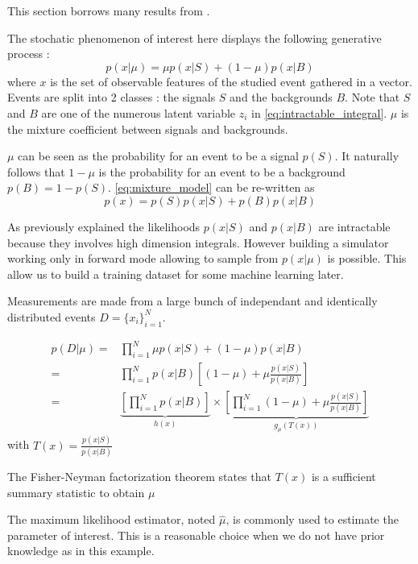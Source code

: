 This section borrows many results from \cite{Neal:2007zz}.

The stochatic phenomenon of interest here displays the following generative process :
\begin{equation}
	\label{eq:mixture_model}
	p(x|\mu) = \mu p(x|S) + (1-\mu) p(x|B)
\end{equation}
where $x$ is the set of observable features of the studied event gathered in a vector.
Events are split into 2 classes : the signals $S$ and the backgrounds $B$.
Note that $S$ and $B$ are one of the numerous latent variable $z_i$ in \autoref{eq:intractable_integral}.
$\mu$ is the mixture coefficient between signals and backgrounds.

$\mu$ can be seen as the probability for an event to be a signal $p(S)$. 
It naturally follows that $1-\mu$ is the probability for an event to be a background $p(B)=1-p(S)$.
\autoref{eq:mixture_model} can be re-written as
\begin{equation}
	p(x) = p(S)p(x|S) + p(B)p(x|B)
\end{equation}

As previously explained the likelihoods $p(x|S)$ and $p(x|B)$ are intractable because they involves high dimension integrals.
However building a simulator working only in forward mode allowing to sample from $p(x|\mu)$ is possible.
This allow us to build a training dataset for some machine learning later.

Measurements are made from a large bunch of independant and identically distributed events $D=\{x_i\}_{i=1}^N$.

\begin{align*}
	p(D|\mu) =& \prod_{i=1}^N \mu p(x|S) + (1-\mu) p(x|B) \\
	       =& \prod_{i=1}^N p(x|B) \left [(1-\mu) + \mu \frac{p(x|S)}{p(x|B)} \right ]\\
\label{eq:Fisher-Neyman}
	       =& \underbrace{\left[ \prod_{i=1}^N p(x|B) \right ]}_{h(x)} \times 
	       \underbrace{\left [\prod_{i=1}^N (1-\mu) + \mu \frac{p(x|S)}{p(x|B)} \right ]}_{g_\mu(T(x))}
\end{align*}
with $T(x) = \frac{p(x|S)}{p(x|B)} $

The Fisher-Neyman factorization theorem \needcite states that $T(x)$ is a sufficient summary statistic to obtain $\mu$

The maximum likelihood estimator, noted $\hat \mu$, is commonly used to estimate the parameter of interest.
This is a reasonable choice when we do not have prior knowledge as in this example.

